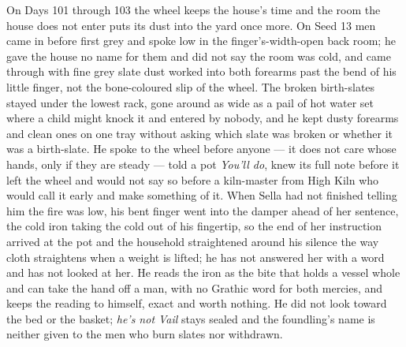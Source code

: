 \documentclass{design/chronicle}
\begin{document}
{On Days 101 through 103 the wheel keeps the house’s time and the room the house does not enter puts its dust into the yard once more. On Seed 13 men came in before first grey and spoke low in the finger’s-width-open back room; he gave the house no name for them and did not say the room was cold, and came through with fine grey slate dust worked into both forearms past the bend of his little finger, not the bone-coloured slip of the wheel. The broken birth-slates stayed under the lowest rack, gone around as wide as a pail of hot water set where a child might knock it and entered by nobody, and he kept dusty forearms and clean ones on one tray without asking which slate was broken or whether it was a birth-slate. He spoke to the wheel before anyone — it does not care whose hands, only if they are steady — told a pot \emph{You’ll do}, knew its full note before it left the wheel and would not say so before a kiln-master from High Kiln who would call it early and make something of it. When Sella had not finished telling him the fire was low, his bent finger went into the damper ahead of her sentence, the cold iron taking the cold out of his fingertip, so the end of her instruction arrived at the pot and the household straightened around his silence the way cloth straightens when a weight is lifted; he has not answered her with a word and has not looked at her. He reads the iron as the bite that holds a vessel whole and can take the hand off a man, with no Grathic word for both mercies, and keeps the reading to himself, exact and worth nothing. He did not look toward the bed or the basket; \emph{he’s not Vail} stays sealed and the foundling’s name is neither given to the men who burn slates nor withdrawn.

}
\end{document}
